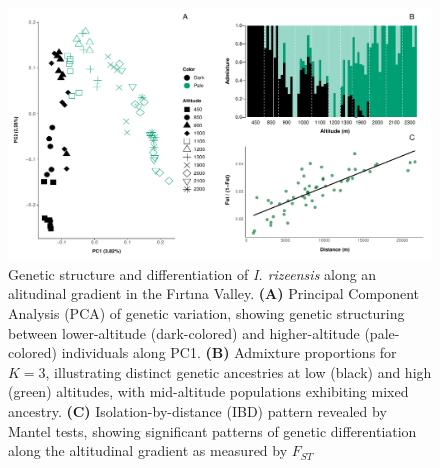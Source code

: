 \documentclass[9pt,a4paper,twoside]{rho-class/rho}
\begin{document}
\clearpage
\newpage
\begin{figure}[h]
\centering
\includegraphics[width=1.8\columnwidth]{Figure_2.pdf}
\caption{Genetic structure and differentiation of \textit{I. rizeensis} along an alitudinal gradient in the Fırtına Valley. \textbf{(A)} Principal Component Analysis (PCA) of genetic variation, showing genetic structuring between lower-altitude (dark-colored) and higher-altitude (pale-colored) individuals along PC1. \textbf{(B)} Admixture proportions for $K=3$, illustrating distinct genetic ancestries at low (black) and high (green) altitudes, with mid-altitude populations exhibiting mixed ancestry. \textbf{(C)} Isolation-by-distance (IBD) pattern revealed by Mantel tests, showing significant patterns of genetic differentiation along the altitudinal gradient as measured by $F_{ST}$}
\label{Figure 2}
\end{figure}
\end{document}
